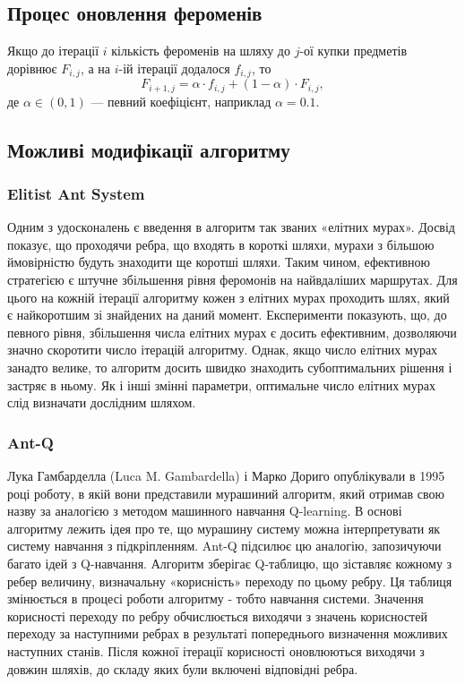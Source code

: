 \documentclass[a4paper, 12pt]{article}
\numberwithin{equation}{section}
\begin{document}
\subsection{Процес оновлення фероменів}

Якщо до ітерації $i$ кількість фероменів на шляху до $j$-ої купки предметів дорівнює $F_{i,j}$, а на $i$-ій ітерації додалося $f_{i,j}$, то
\begin{equation}
    F_{i+1,j} = \alpha \cdot f_{i, j} + (1 - \alpha) \cdot F_{i, j},
\end{equation}
де $\alpha \in (0, 1)$ --- певний коефіцієнт, наприклад $\alpha = 0.1$.

\subsection{Можливі модифікації алгоритму}

\subsubsection{Elitist Ant System}

Одним з удосконалень є введення в алгоритм так званих «елітних мурах». Досвід показує, що проходячи ребра, що входять в короткі шляхи, мурахи з більшою ймовірністю будуть знаходити ще коротші шляхи. Таким чином, ефективною стратегією є штучне збільшення рівня феромонів на найвдаліших маршрутах. Для цього на кожній ітерації алгоритму кожен з елітних мурах проходить шлях, який є найкоротшим зі знайдених на даний момент.
Експерименти показують, що, до певного рівня, збільшення числа елітних мурах є досить ефективним, дозволяючи значно скоротити число ітерацій алгоритму. Однак, якщо число елітних мурах занадто велике, то алгоритм досить швидко знаходить субоптимальних рішення і застряє в ньому. Як і інші змінні параметри, оптимальне число елітних мурах слід визначати дослідним шляхом.

\subsubsection{Ant-Q}

Лука Гамбарделла (Luca M. Gambardella) і Марко Дориго опублікували в 1995 році роботу, в якій вони представили мурашиний алгоритм, який отримав свою назву за аналогією з методом машинного навчання Q-learning. В основі алгоритму лежить ідея про те, що мурашину систему можна інтерпретувати як систему навчання з підкріпленням. Ant-Q підсилює цю аналогію, запозичуючи багато ідей з Q-навчання.
Алгоритм зберігає Q-таблицю, що зіставляє кожному з ребер величину, визначальну «корисність» переходу по цьому ребру. Ця таблиця змінюється в процесі роботи алгоритму - тобто навчання системи. Значення корисності переходу по ребру обчислюється виходячи з значень корисностей переходу за наступними ребрах в результаті попереднього визначення можливих наступних станів. Після кожної ітерації корисності оновлюються виходячи з довжин шляхів, до складу яких були включені відповідні ребра.
\end{document}
